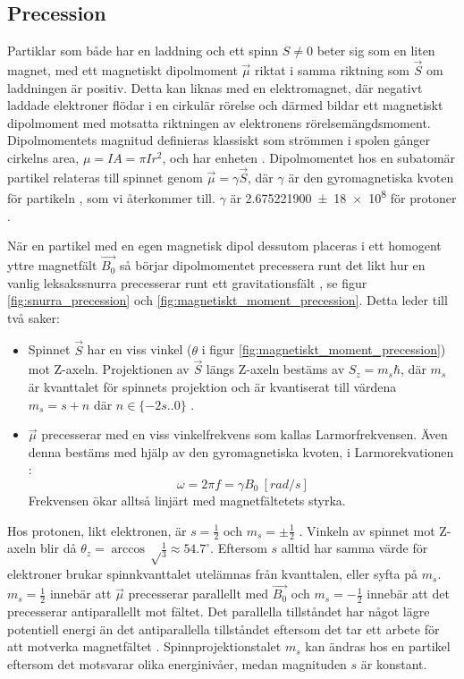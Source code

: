 \documentclass[11pt, a4paper]{article}
\begin{document}
\subsection{Precession}
Partiklar som både har en laddning och ett spinn $S\neq0$ beter sig som en liten magnet, med ett magnetiskt dipolmoment $\vec{\mu}$ riktat i samma riktning som $\vec{S}$ om laddningen är positiv. Detta kan liknas med en elektromagnet, där negativt laddade elektroner flödar i en cirkulär rörelse och därmed bildar ett magnetiskt dipolmoment med motsatta riktningen av elektronens rörelsemängdsmoment. Dipolmomentets magnitud definieras klassiskt som strömmen i spolen gånger cirkelns area, $\mu=IA=\pi Ir^2$, och har enheten \si{\left[A.m^2\right]} \parencite{magnetism}. Dipolmomentet hos en subatomär partikel relateras till spinnet genom $\vec{\mu}=\gamma\vec{S}$, där $\gamma$ är den gyromagnetiska kvoten för partikeln \parencite{larmor_precession}, som vi återkommer till. $\gamma$ är \SI{2.675 221 900(18) e8}{\left[s^{-1}.T^{-1}\right]} för protoner \parencite{gyro_ratio}. 

När en partikel med en egen magnetisk dipol dessutom placeras i ett homogent yttre magnetfält $\vec{B_0}$ så börjar dipolmomentet precessera runt det likt hur en vanlig leksakssnurra precesserar runt ett gravitationsfält \parencite{larmor_precession}, se figur \ref{fig:snurra_precession} och \ref{fig:magnetiskt_moment_precession}. Detta leder till två saker:
\begin{itemize}
	\item Spinnet $\vec{S}$ har en viss vinkel ($\theta$ i figur \ref{fig:magnetiskt_moment_precession}) mot Z-axeln. Projektionen av $\vec{S}$ längs Z-axeln bestäms av $S_z=m_s\hbar$, där $m_s$ är kvanttalet för spinnets projektion och är kvantiserat till värdena $m_s=s+n$ där $n\in\{-2s..0\}$ \parencite{university_physics}.
	\item $\vec{\mu}$ precesserar med en viss vinkelfrekvens som kallas Larmorfrekvensen. Även denna bestäms med hjälp av den gyromagnetiska kvoten, i Larmorekvationen \parencite{mri_lärobok}:
	\begin{equation}\label{eq:larmor}
		\omega=2\pi f=\gamma B_0\:[\si{rad/s}]
	\end{equation}
	Frekvensen ökar alltså linjärt med magnetfältetets styrka.
\end{itemize}

Hos protonen, likt elektronen, är $s=\frac{1}{2}$ och $m_s=\pm\frac{1}{2}$ \parencite{college_physics}. Vinkeln av spinnet mot Z-axeln blir då $\theta_z=\arccos\sqrt\frac{1}{3}\approx54.7^\circ$. Eftersom $s$ alltid har samma värde för elektroner brukar spinnkvanttalet utelämnas från kvanttalen, eller syfta på $m_s$. $m_s=\frac{1}{2}$ innebär att $\vec{\mu}$ precesserar parallellt med $\vec{B_0}$ och $m_s=-\frac{1}{2}$ innebär att det precesserar antiparallellt mot fältet. Det parallella tillståndet har något lägre potentiell energi än det antiparallella tillståndet eftersom det tar ett arbete för att motverka magnetfältet \parencite{electron_spin}. Spinnprojektionstalet $m_s$ kan ändras hos en partikel eftersom det motsvarar olika energinivåer, medan magnituden $s$ är konstant. 
\end{document}
